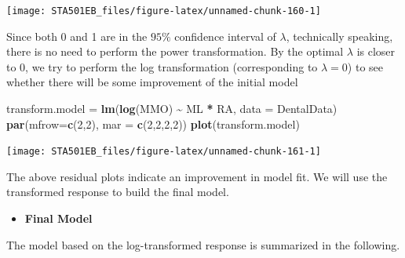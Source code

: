 \documentclass[
]{book}
\newenvironment{Shaded}{\begin{snugshade}}{\end{snugshade}}
\newcommand{\AttributeTok}[1]{\textcolor[rgb]{0.13,0.29,0.53}{#1}}
\newcommand{\DecValTok}[1]{\textcolor[rgb]{0.00,0.00,0.81}{#1}}
\newcommand{\FunctionTok}[1]{\textcolor[rgb]{0.13,0.29,0.53}{\textbf{#1}}}
\newcommand{\NormalTok}[1]{#1}
\newcommand{\OtherTok}[1]{\textcolor[rgb]{0.56,0.35,0.01}{#1}}
\newcommand{\SpecialCharTok}[1]{\textcolor[rgb]{0.81,0.36,0.00}{\textbf{#1}}}
\newcommand{\StringTok}[1]{\textcolor[rgb]{0.31,0.60,0.02}{#1}}
\providecommand{\tightlist}{%
  \setlength{\itemsep}{0pt}\setlength{\parskip}{0pt}}
\begin{document}
\begin{center}\texttt{[image: STA501EB\_files/figure-latex/unnamed-chunk-160-1]} \end{center}

Since both 0 and 1 are in the \(95\%\) confidence interval of \(\lambda\), technically speaking, there is no need to perform the power transformation. By the optimal \(\lambda\) is closer to 0, we try to perform the log transformation (corresponding to \(\lambda =0\)) to see whether there will be some improvement of the initial model

\begin{Shaded}
\begin{Highlighting}[]
\NormalTok{transform.model }\OtherTok{=} \FunctionTok{lm}\NormalTok{(}\FunctionTok{log}\NormalTok{(MMO) }\SpecialCharTok{\textasciitilde{}}\NormalTok{ ML }\SpecialCharTok{*}\NormalTok{ RA, }\AttributeTok{data  =}\NormalTok{ DentalData)}
\FunctionTok{par}\NormalTok{(}\AttributeTok{mfrow=}\FunctionTok{c}\NormalTok{(}\DecValTok{2}\NormalTok{,}\DecValTok{2}\NormalTok{), }\AttributeTok{mar =} \FunctionTok{c}\NormalTok{(}\DecValTok{2}\NormalTok{,}\DecValTok{2}\NormalTok{,}\DecValTok{2}\NormalTok{,}\DecValTok{2}\NormalTok{))}
\FunctionTok{plot}\NormalTok{(transform.model)}
\end{Highlighting}
\end{Shaded}

\begin{center}\texttt{[image: STA501EB\_files/figure-latex/unnamed-chunk-161-1]} \end{center}

The above residual plots indicate an improvement in model fit. We will use the transformed response to build the final model.

\begin{itemize}
\tightlist
\item
  \textbf{Final Model}
\end{itemize}

The model based on the log-transformed response is summarized in the following.

\begin{Shaded}
\end{Shaded}
\end{document}
